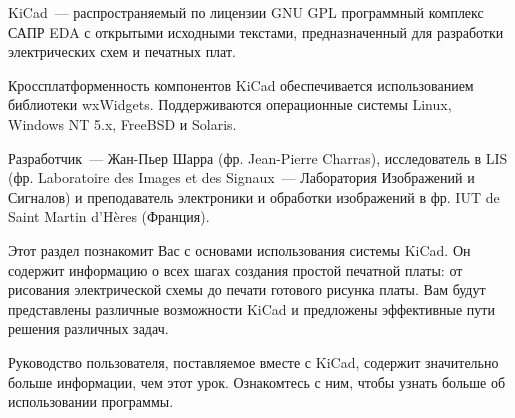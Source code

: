 

KiCad\ --- распространяемый по лицензии GNU GPL программный комплекс САПР EDA с
открытыми исходными текстами, предназначенный для разработки электрических схем
и печатных плат.

Кроссплатформенность компонентов KiCad обеспечивается использованием 
библиотеки wxWidgets. Поддерживаются операционные системы Linux, 
Windows NT 5.x, Free\-BSD и Solaris.

Разработчик\ --- Жан-Пьер Шарра (фр. Jean-Pierre Charras), исследователь 
в LIS (фр. Laboratoire des Images et des Signaux\ --- Лаборатория Изображений 
и Сигналов) и преподаватель электроники и обработки изображений в фр. 
IUT de Saint Martin d’Hères (Франция).


Этот раздел познакомит Вас с основами использования системы KiCad. Он содержит
информацию о всех шагах создания простой печатной платы: от рисования
электрической схемы до печати готового рисунка платы. Вам будут представлены
различные возможности KiCad и предложены эффективные пути решения различных
задач.

Руководство пользователя, поставляемое вместе с KiCad, содержит значительно
больше информации, чем этот урок. Ознакомтесь с ним, чтобы узнать больше об
использовании программы.

